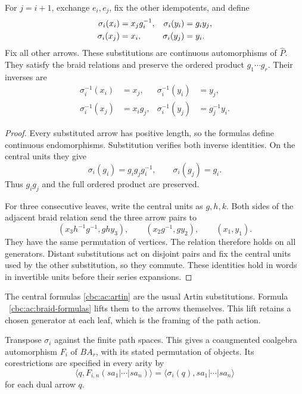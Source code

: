 \begin{theorem}\label{cbc:ac:braid-substitution}
For $j=i+1$, exchange $e_i,e_j$, fix the other
idempotents, and define
\begin{align}
 \sigma_i(x_i)&=x_jg_i^{-1},&
 \sigma_i(y_i)&=g_i y_j,\notag\\
 \sigma_i(x_j)&=x_i,&
 \sigma_i(y_j)&=y_i.
                 \label{cbc:ac:braid-formulas}
\end{align}
Fix all other arrows. These substitutions are
continuous automorphisms of $\widehat P$.
They satisfy the braid relations and preserve
the ordered product $g_1\cdots g_r$.
Their inverses are
\[
 \begin{aligned}
  \sigma_i^{-1}(x_i)&=x_j,&
  \sigma_i^{-1}(y_i)&=y_j,\\
  \sigma_i^{-1}(x_j)&=x_i g_j,&
  \sigma_i^{-1}(y_j)&=g_j^{-1}y_i.
 \end{aligned}
\]
\end{theorem}
\begin{proof}
Every substituted arrow has positive length,
so the formulas define continuous endomorphisms.
Substitution verifies both inverse identities.
On the central units they give
\begin{equation}\label{cbc:ac:artin}
 \sigma_i(g_i)=g_ig_jg_i^{-1},\qquad
 \sigma_i(g_j)=g_i.
\end{equation}
Thus $g_ig_j$ and the full ordered product are
preserved.

For three consecutive leaves, write the central
units as $g,h,k$. Both sides of the adjacent
braid relation send the three arrow pairs to
\[
 (x_3h^{-1}g^{-1},ghy_3),\qquad
 (x_2g^{-1},gy_2),\qquad
 (x_1,y_1).
\]
They have the same permutation of vertices.
The relation therefore holds on all generators.
Distant substitutions act on disjoint pairs
and fix the central units used by the other
substitution, so they commute.
These identities hold in words in invertible
units before their series expansions.
\end{proof}

The central formulas \eqref{cbc:ac:artin} are
the usual Artin substitutions. Formula
~\eqref{cbc:ac:braid-formulas} lifts them to
the arrows themselves. This lift retains a
chosen generator at each leaf, which is the
framing of the path action.

Transpose $\sigma_i$ against the finite path
spaces. This gives a coaugmented coalgebra
automorphism $F_i$ of $BA_r$, with its stated
permutation of objects. Its corestrictions
are specified in every arity by
\begin{equation}\label{cbc:ac:braid-transpose}
 \langle q,F_{i,n}(sa_1|\cdots|sa_n)\rangle
      =\langle\sigma_i(q),sa_1|\cdots|sa_n\rangle
\end{equation}
for each dual arrow $q$.

